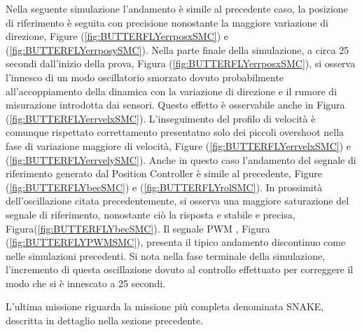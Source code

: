 Nella seguente simulazione l'andamento è simile al precedente caso, la posizione di riferimento è seguita con precisione nonostante la maggiore variazione di direzione, Figure (\ref{fig:BUTTERFLYerrposxSMC}) e (\ref{fig:BUTTERFLYerrposySMC}). Nella parte finale della simulazione, a circa 25 secondi dall'inizio della prova, Figura (\ref{fig:BUTTERFLYerrposxSMC}), si  osserva l'innesco di un modo oscillatorio smorzato dovuto probabilmente all'accoppiamento della dinamica con la variazione di direzione e il rumore di misurazione introdotta dai sensori. Questo effetto è osservabile anche in Figura (\ref{fig:BUTTERFLYerrvelxSMC}). L'inseguimento del profilo di velocità è comunque rispettato correttamento presentatno solo dei piccoli overshoot nella fase di variazione maggiore di velocità, Figure (\ref{fig:BUTTERFLYerrvelxSMC}) e (\ref{fig:BUTTERFLYerrvelySMC}). Anche in questo caso l'andamento del segnale di riferimento generato dal Position Controller è simile al precedente, Figure (\ref{fig:BUTTERFLYbecSMC}) e (\ref{fig:BUTTERFLYrolSMC}). In prossimità dell'oscillazione citata precedentemente, si osserva una maggiore saturazione del segnale di riferimento, nonostante ciò la risposta e stabile e precisa, Figura(\ref{fig:BUTTERFLYbecSMC}). Il segnale PWM , Figura (\ref{fig:BUTTERFLYPWMSMC}), presenta il tipico andamento discontinuo come nelle simulazioni precedenti. Si nota nella fase terminale della simulazione, l'incremento di questa oscillazione dovuto al controllo effettuato per correggere il modo che si è innescato a 25 secondi.

L'ultima missione riguarda la missione più completa denominata SNAKE, descritta in dettaglio nella sezione precedente.

